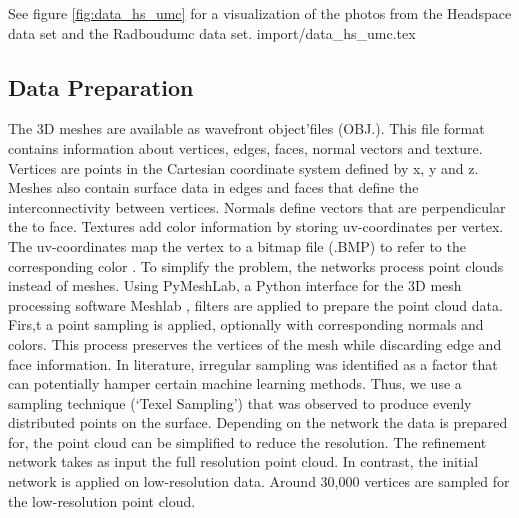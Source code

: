 \documentclass[class=article, crop=false]{standalone}
\begin{document}
See figure \ref{fig:data_hs_umc} for a visualization of the photos from the Headspace data set and the Radboudumc data set.
{import/data_hs_umc.tex}

\subsection{Data Preparation}
The 3D meshes are available as wavefront object’files (OBJ.). This file format contains information about vertices, edges, faces, normal vectors and texture.
Vertices are points in the Cartesian coordinate system defined by x, y and z. Meshes also contain surface data in edges and faces that define the interconnectivity between vertices. Normals define vectors that are perpendicular the to face. Textures add color information by storing uv-coordinates per vertex. The uv-coordinates map the vertex to a bitmap file (.BMP) to refer to the corresponding color  \cite{Jong}.
To simplify the problem, the networks process point clouds instead of meshes. Using PyMeshLab, a Python interface for the 3D mesh processing software Meshlab \cite{meshlab}, filters are applied to prepare the point cloud data. Firs,t a point sampling is applied, optionally with corresponding normals and colors. This process preserves the vertices of the mesh while discarding edge and face information. In literature, irregular sampling was identified as a factor that can potentially hamper certain machine learning methods. Thus, we use a sampling technique (‘Texel Sampling’) that was observed to produce evenly distributed points on the surface. Depending on the network the data is prepared for, the point cloud can be simplified to reduce the resolution. The refinement network takes as input the full resolution point cloud. In contrast, the initial network is applied on low-resolution data. Around 30,000 vertices are sampled for the low-resolution point cloud.
\end{document}
